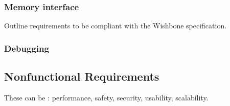 \subsubsection{Memory interface}
\label{spec-memory-interface}


\begin{content}
  Outline requirements to be compliant with the Wishbone specification.
\end{content}

\subsubsection{Debugging}

\subsection{Nonfunctional Requirements}



\begin{content}
These can be : performance, safety, security, usability, scalability.
\end{content}

\newpage
